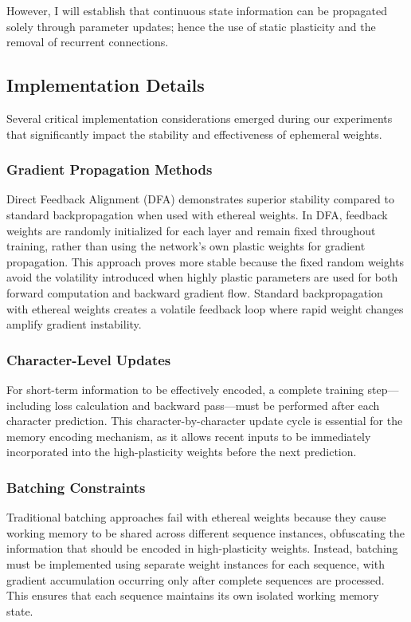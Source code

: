 \documentclass{article} %
\begin{document}
However, I will establish that continuous state information can be propagated solely through parameter updates; hence the use of static plasticity and the removal of recurrent connections.

\subsection{Implementation Details}

Several critical implementation considerations emerged during our experiments that significantly impact the stability and effectiveness of ephemeral weights.

\subsubsection{Gradient Propagation Methods}

Direct Feedback Alignment (DFA) demonstrates superior stability compared to standard backpropagation when used with ethereal weights. In DFA, feedback weights are randomly initialized for each layer and remain fixed throughout training, rather than using the network's own plastic weights for gradient propagation. This approach proves more stable because the fixed random weights avoid the volatility introduced when highly plastic parameters are used for both forward computation and backward gradient flow. Standard backpropagation with ethereal weights creates a volatile feedback loop where rapid weight changes amplify gradient instability.

\subsubsection{Character-Level Updates}

For short-term information to be effectively encoded, a complete training step—including loss calculation and backward pass—must be performed after each character prediction. This character-by-character update cycle is essential for the memory encoding mechanism, as it allows recent inputs to be immediately incorporated into the high-plasticity weights before the next prediction.

\subsubsection{Batching Constraints}

Traditional batching approaches fail with ethereal weights because they cause working memory to be shared across different sequence instances, obfuscating the information that should be encoded in high-plasticity weights. Instead, batching must be implemented using separate weight instances for each sequence, with gradient accumulation occurring only after complete sequences are processed. This ensures that each sequence maintains its own isolated working memory state.
\end{document}
